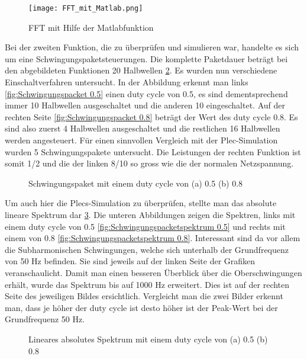 \begin{figure}[ht!]
	\centering
	\texttt{[image: FFT\_mit\_Matlab.png]}	
	\caption{FFT mit Hilfe der Matlabfunktion}
	\label{fig:FFT mit Matlab}
\end{figure}

Bei der zweiten Funktion, die zu überprüfen und simulieren war, handelte es sich um eine Schwingungspaketsteuerungen. Die komplette Paketdauer beträgt bei den abgebildeten Funktionen 20 Halbwellen \ref{fig:Schwingungspaket Matlab}. Es wurden nun verschiedene Einschaltverfahren untersucht. In der Abbildung  erkennt man links \ref{fig:Schwingungspacket 0.5} einen duty cycle von 0.5, es sind dementsprechend immer 10 Halbwellen  ausgeschaltet und die anderen 10 eingeschaltet. Auf der rechten Seite \ref{fig:Schwingungspacket 0.8} beträgt der Wert des duty cycle 0.8. Es sind also zuerst 4 Halbwellen ausgeschaltet und die restlichen 16 Halbwellen werden angesteuert. Für einen sinnvollen Vergleich mit der Plec-Simulation wurden 5 Schwingungspakete untersucht. Die Leistungen der rechten Funktion ist somit 1/2 und die der linken 8/10 so gross wie die der normalen Netzspannung.

\begin{figure}[h]
	\centering
	\qquad
	\caption{Schwingungspaket mit einem duty cycle von (a) 0.5 (b) 0.8}
	\label{fig:Schwingungspaket Matlab}
\end{figure} 

Um auch hier die Plecs-Simulation zu überprüfen, stellte man das absolute lineare Spektrum dar \ref{fig:Schwingungspaketspektrum Matlab}. Die unteren  Abbildungen zeigen die Spektren, links mit einem duty cycle von 0.5 \ref{fig:Schwingungspacketspektrum 0.5} und rechts mit einem von 0.8 \ref{fig:Schwingungspacketspektrum 0.8}. Interessant sind da vor allem die Subharmonischen Schwingungen, welche sich unterhalb der Grundfrequenz von 50 Hz befinden. Sie sind jeweils auf der linken Seite der Grafiken veranschaulicht. Damit man einen besseren Überblick über die Oberschwingungen erhält, wurde das Spektrum bis auf 1000 Hz erweitert. Dies ist auf der rechten Seite des jeweiligen Bildes ersichtlich. Vergleicht man die zwei Bilder erkennt man, dass je höher der duty cycle ist desto höher ist der Peak-Wert bei der Grundfrequenz 50 Hz. 

\begin{figure}[h]
	\centering
	\qquad
	\caption{Lineares absolutes Spektrum mit einem duty cycle von (a) 0.5 (b) 0.8}
	\label{fig:Schwingungspaketspektrum Matlab}
\end{figure}

